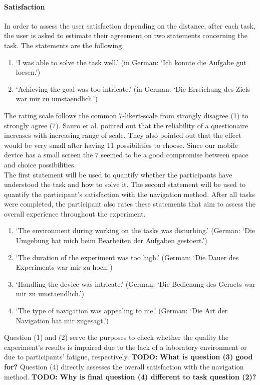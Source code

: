 \documentclass{sig-alternate-05-2015}
\newcommand{\todo}{\textbf{TODO:} \textbf}
\begin{document}
\paragraph{Satisfaction}
In order to assess the user satisfaction depending on the distance, after each task, the user is asked to estimate their
agreement on two statements concerning the task. The statements are the following.
\begin{enumerate}
  \item `I was able to solve the task well.' (in German: `Ich konnte die Aufgabe gut loesen.')
  \item `Achieving the goal was too intricate.' (in German: `Die Erreichung des Ziels war mir zu umstaendlich.')
\end{enumerate}
The rating scale follows the common 7-likert-scale from strongly disagree (1) to strongly agree (7). Sauro et al. \cite{sauro2009comparison} pointed out that the reliability of a questionaire increases with increasing range of scale. They also pointed out that the effect would be very small after having 11 possibilities to choose. Since our mobile device has a small screen the 7 seemed to be a good compromise between space and choice possibilities.\\
The first statement will be used to quantify whether the participants have understood the task and how to solve it. The second statement will
be used to quantify the participant's satisfaction with the navigation method.
After all tasks were completed, the participant also rates these statements that aim to assess the overall experience throughout the experiment.
\begin{enumerate}
  \item `The environment during working on the tasks was disturbing.' (German: `Die Umgebung hat mich beim Bearbeiten der Aufgaben gestoert.')
  \item `The duration of the experiment was too high.' (German: `Die Dauer des Experiments war mir zu hoch.')
  \item `Handling the device was intricate.' (German: `Die Bedienung des Geraets war mir zu umstaendlich.')
  \item `The type of navigation was appealing to me.' (German: `Die Art der Navigation hat mir zugesagt.')
\end{enumerate}
Question (1) and (2) serve the purposes to check whether the quality the experiment's results is impaired due to the lack of a laboratory environment or
due to participants' fatigue, respectively. \todo{What is question (3) good for?} Question (4) directly assesses the overall satisfaction with the navigation method.
\todo{Why is final question (4) different to task question (2)?}
\end{document}
